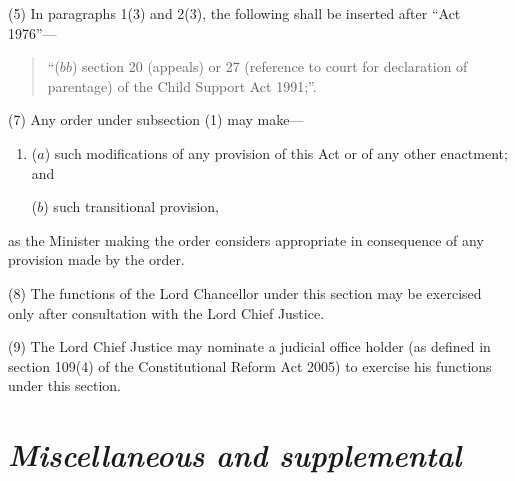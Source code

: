 \documentclass[12pt,a4paper]{article}
\begin{document}
(5) In paragraphs 1(3)  and 2(3), the following shall be inserted after “Act 1976”—
\begin{quotation}
“($bb$) section 20 (appeals) or 27 (reference to court for declaration of parentage) of the Child Support Act 1991;”.
\end{quotation}


(7) Any order under subsection (1)  
may make—
\begin{enumerate}\item[]
($a$) such modifications of any provision of this Act or of any other enactment; and

($b$) such transitional provision,
\end{enumerate}
as the Minister making the order considers appropriate in consequence of any provision made by the order.

(8) The functions of the Lord Chancellor under this section may be exercised only after consultation with the Lord Chief Justice.

(9) The Lord Chief Justice may nominate a judicial office holder (as defined in section 109(4) of the Constitutional Reform Act 2005) to exercise his functions under this section.


\section{\itshape Miscellaneous and supplemental}
\end{document}
